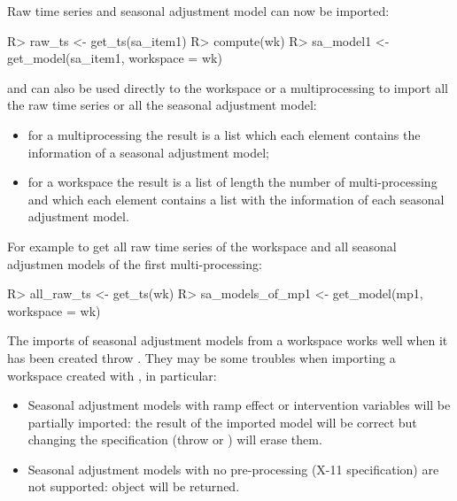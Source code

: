 \documentclass[article]{jss}
\providecommand{\tightlist}{%
  \setlength{\itemsep}{0pt}\setlength{\parskip}{0pt}}
\begin{document}
Raw time series and seasonal adjustment model can now be imported:

\begin{CodeChunk}

\begin{CodeInput}
R> raw_ts <- get_ts(sa_item1)
R> compute(wk)
R> sa_model1 <- get_model(sa_item1, workspace = wk)
\end{CodeInput}
\end{CodeChunk}

 and  can also be used directly to the
workspace or a multiprocessing to import all the raw time series or all
the seasonal adjustment model:

\begin{itemize}
\tightlist
\item
  for a multiprocessing the result is a list which each element contains
  the information of a seasonal adjustment model;\\
\item
  for a workspace the result is a list of length the number of
  multi-processing and which each element contains a list with the
  information of each seasonal adjustment model.
\end{itemize}

For example to get all raw time series of the workspace and all seasonal
adjustmen models of the first multi-processing:

\begin{CodeChunk}

\begin{CodeInput}
R> all_raw_ts <- get_ts(wk)
R> sa_models_of_mp1 <- get_model(mp1, workspace = wk)
\end{CodeInput}
\end{CodeChunk}

The imports of seasonal adjustment models from a workspace works well
when it has been created throw . They may be some
troubles when importing a workspace created with ,
in particular:

\begin{itemize}
\tightlist
\item
  Seasonal adjustment models with ramp effect or intervention variables
  will be partially imported: the result of the imported model will be
  correct but changing the specification (throw  or
  ) will erase them.\\
\item
  Seasonal adjustment models with no pre-processing (X-11 specification)
  are not supported:  object will be returned.
\end{itemize}
\end{document}
